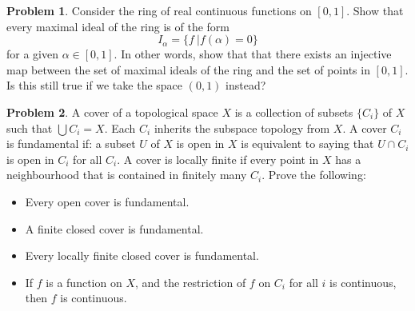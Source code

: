 \documentclass[10pt,a4paper,notitlepage]{article}
\theoremstyle{definition}
\newtheorem{prob}{Problem}
\begin{document}
\begin{prob}
    Consider the ring of real continuous functions on $[0,1]$. Show that every maximal ideal of the ring is of the form
    $$I_{\alpha} = \{f\ | f(\alpha) = 0\}$$
    for a given $\alpha \in [0,1]$. In other words, show that that there exists an injective map between the set of maximal ideals of the ring and the set of points in $[0,1]$. Is this still true if we take the space $(0,1)$ instead?
\end{prob}

\begin{prob}
    A cover of a topological space $X$ is a collection of subsets $\{C_i\}$ of $X$ such that $\bigcup C_i = X$. Each $C_i$ inherits the subspace topology from $X$. A cover $C_i$ is fundamental if: a subset $U$ of $X$ is open in $X$ is equivalent to saying that $U \cap C_i$ is open in $C_i$ for all $C_i$. A cover is locally finite if every point in $X$ has a neighbourhood that is contained in finitely many $C_i$. Prove the following:
    \begin{itemize}
        \item Every open cover is fundamental.
        \item A finite closed cover is fundamental.
        \item Every locally finite closed cover is fundamental.
        \item If $f$ is a function on $X$, and the restriction of $f$ on $C_i$ for all $i$ is continuous, then $f$ is continuous.
    \end{itemize}
\end{prob}
\end{document}
